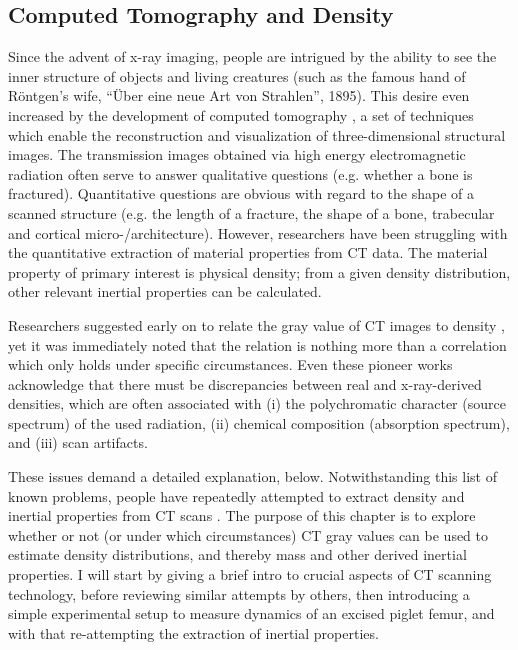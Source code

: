 \subsection{Computed Tomography and Density}
\label{sec:org9c73d2d}
Since the advent of x-ray imaging, people are intrigued by the ability to see the inner structure of objects and living creatures (such as the famous hand of Röntgen's wife, ``Über eine neue Art von Strahlen'', 1895).
This desire even increased by the development of computed tomography \citep[CT;][]{Beckmann2006,Hounsfield1973}, a set of techniques which enable the reconstruction and visualization of three-dimensional structural images.
The transmission images obtained via high energy electromagnetic radiation often serve to answer qualitative questions (e.g. whether a bone is fractured).
Quantitative questions are obvious with regard to the shape of a scanned structure (e.g. the length of a fracture, the shape of a bone, trabecular and cortical micro-/architecture).
However, researchers have been struggling with the quantitative extraction of material properties from CT data.
The material property of primary interest is physical density; from a given density distribution, other relevant inertial properties can be calculated.


Researchers suggested early on to relate the gray value of CT images to density \citep{Mull1984,Phelps1975}, yet it was immediately noted that the relation is nothing more than a correlation which only holds under specific circumstances.
Even these pioneer works acknowledge that there must be discrepancies between real and x-ray-derived densities, which are often associated with (i) the polychromatic character (source spectrum) of the used radiation, (ii) chemical composition (absorption spectrum), and (iii) scan artifacts.

These issues demand a detailed explanation, below.
Notwithstanding this list of known problems, people have repeatedly attempted to extract density and inertial properties from CT scans  \citep[][as well as the present study]{Phillips1997,DuPlessis2013,Durston2022}.
The purpose of this chapter is to explore whether or not (or under which circumstances) CT gray values can be used to estimate density distributions, and thereby mass and other derived inertial properties.
I will start by giving a brief intro to crucial aspects of CT scanning technology, before reviewing similar attempts by others, then introducing a simple experimental setup to measure dynamics of an excised piglet femur, and with that re-attempting the extraction of inertial properties.
